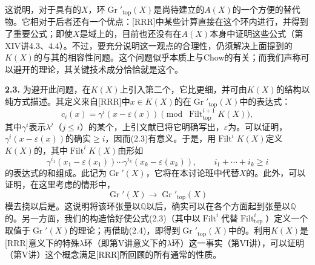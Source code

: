 这说明，对于具有的$X$，环$\operatorname{Gr}'_{\mathrm{top}}(X)$是尚待建立的$A(X)$的一个方便的替代物。它相对于后者还有一个优点：[RRR]中某些计算直接在这个环内进行，并得到了重要公式；即使$X$是域上的，目前也还没有在$A(X)$本身中证明这些公式（第XIV讲4.3、4.4）。不过，要充分说明这一观点的合理性，仍须解决上面提到的$K(X)$的与其的相容性问题。这个问题似乎本质上与Chow的有关；而我们声称可以避开的理论，其关键技术成分恰恰就是这个。

\textbf{2.3.} 为避开此问题，在$K(X)$上引入第二个，它比更细，并可由$K(X)$的结构以纯方式描述。其定义来自[RRR]中$x\in K(X)$的在$\operatorname{Gr}'_{\mathrm{top}}(X)$中的表达式：
\[c_i(x)=\gamma^i(x-\varepsilon(x))\pmod{\operatorname{Filt}^{i+1}_{\mathrm{top}}K(X)},\tag{2.3}\]
其中$\gamma^i$表示$\lambda^j$（$j\leq i$）的某个，上引文献已将它明确写出，$\varepsilon$为。可以证明，$\gamma^i(x-\varepsilon(x))$的确实$\geq i$，因而(2.3)有意义。于是，用$\operatorname{Filt}^iK(X)$定义$K(X)$的，其中$\operatorname{Filt}^iK(X)$由形如
\[\gamma^{i_1}(x_1-\varepsilon(x_1))\cdots\gamma^{i_k}(x_k-\varepsilon(x_k)),
\qquad i_1+\cdots+i_k\geq i\]
的表达式的和组成。此记为$\operatorname{Gr}'(X)$，它将在本讨论班中代替$X$的。此外，可以证明，在这里考虑的情形中，
\[\operatorname{Gr}'(X)\longrightarrow\operatorname{Gr}'_{\mathrm{top}}(X)\tag{2.4}\]
模去挠以后是。这说明将该环张量以$\mathbb Q$以后，确实可以在各个方面起到张量以$\mathbb Q$的。另一方面，我们的构造恰好使公式(2.3)（其中以$\operatorname{Filt}^i$代替$\operatorname{Filt}^i_{\mathrm{top}}$）定义一个取值于$\operatorname{Gr}'(X)$的理论；再借助(2.4)，即得到$\operatorname{Gr}'_{\mathrm{top}}(X)$中的。利用$K(X)$是[RRR]意义下的特殊$\lambda$环（即第V讲意义下的$\lambda$环）这一事实（第VI讲），可以证明（第V讲）这个概念满足[RRR]所回顾的所有通常的性质。

